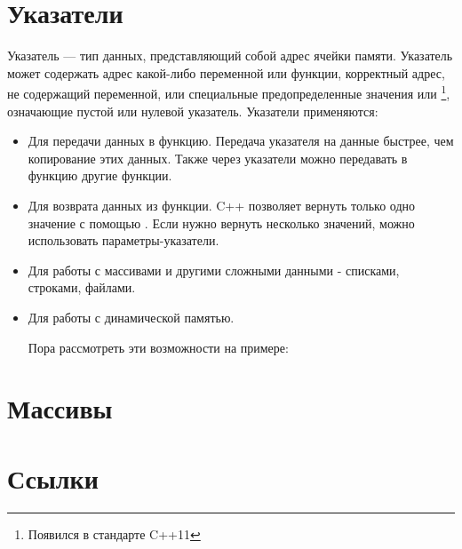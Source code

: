 \documentclass[book.tex]{subfiles}
\begin{document}



\maketitle

\section*{Указатели}


Указатель --- тип данных, представляющий собой адрес ячейки памяти. Указатель может содержать адрес какой-либо переменной или функции, корректный адрес, не содержащий переменной, или специальные предопределенные значения  или \footnote{Появился в стандарте C++11}, означающие пустой или нулевой указатель. Указатели применяются:

\begin{itemize}

\item Для передачи данных в функцию. Передача указателя на данные быстрее, чем копирование этих данных. Также через указатели можно передавать в функцию другие функции.

\item Для возврата данных из функции. C++ позволяет вернуть только одно значение с помощью . Если нужно вернуть несколько значений, можно использовать параметры-указатели.

\item Для работы с массивами и другими сложными данными - списками, строками, файлами.

\item Для работы с динамической памятью.

Пора рассмотреть эти возможности на примере:


\end{itemize}

\section*{Массивы}

\section*{Ссылки}
\end{document}
